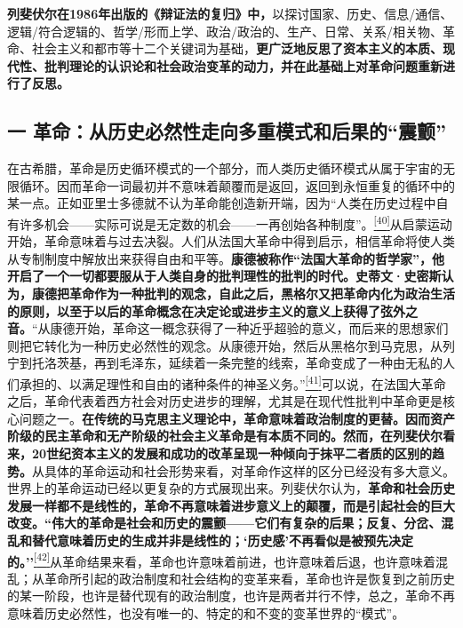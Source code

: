\documentclass[UTF8, fontset = sourcesans, a4paper, oneside, zihao =
-4, scheme=chinese, no-math, space=true]{ctexbook}
\begin{document}
\textbf{列斐伏尔在1986年出版的《辩证法的复归》中，}以探讨国家、历史、信息/通信、逻辑/符合逻辑的、哲学/形而上学、政治/政治的、生产、日常、关系/相关物、革命、社会主义和都市等十二个关键词为基础，\textbf{更广泛地反思了资本主义的本质、现代性、批判理论的认识论和社会政治变革的动力，并在此基础上对革命问题重新进行了反思。}

\subsection{\texorpdfstring{一
革命：从历史必然性走向多重模式和后果的``震颤''}{一 革命：从历史必然性走向多重模式和后果的震颤}}\label{part0008_split_003.htmlux5cux23c043}

在古希腊，革命是历史循环模式的一个部分，而人类历史循环模式从属于宇宙的无限循环。因而革命一词最初并不意味着颠覆而是返回，返回到永恒重复的循环中的某一点。正如亚里士多德就不认为革命能创造新开端，因为``人类在历史过程中自有许多机会------实际可说是无定数的机会------一再创始各种制度''。\protect\hypertarget{part0008_split_003.htmlux5cux23w40}{}{}\protect\hyperlink{part0008_split_003.htmlux5cux23m40}{\textsuperscript{{[}40{]}}}从启蒙运动开始，革命意味着与过去决裂。人们从法国大革命中得到启示，相信革命将使人类从专制制度中解放出来获得自由和平等。\textbf{康德被称作``法国大革命的哲学家''，他开启了一个一切都要服从于人类自身的批判理性的批判的时代。史蒂文·史密斯认为，康德把革命作为一种批判的观念，自此之后，黑格尔又把革命内化为政治生活的原则，以至于以后的革命概念在决定论或进步主义的意义上获得了弦外之音。}``从康德开始，革命这一概念获得了一种近乎超验的意义，而后来的思想家们则把它转化为一种历史必然性的观念。从康德开始，然后从黑格尔到马克思，从列宁到托洛茨基，再到毛泽东，延续着一条完整的线索，革命变成了一种由无私的人们承担的、以满足理性和自由的诸种条件的神圣义务。''\protect\hypertarget{part0008_split_003.htmlux5cux23w41}{}{}\protect\hyperlink{part0008_split_003.htmlux5cux23m41}{\textsuperscript{{[}41{]}}}可以说，在法国大革命之后，革命代表着西方社会对历史进步的理解，尤其是在现代性批判中革命更是核心问题之一。\textbf{在传统的马克思主义理论中，革命意味着政治制度的更替。因而资产阶级的民主革命和无产阶级的社会主义革命是有本质不同的。然而，在列斐伏尔看来，20世纪资本主义的发展和成功的改革呈现一种倾向于抹平二者质的区别的趋势。}从具体的革命运动和社会形势来看，对革命作这样的区分已经没有多大意义。世界上的革命运动已经以更复杂的方式展现出来。列斐伏尔认为，\textbf{革命和社会历史发展一样都不是线性的，革命不再意味着进步意义上的颠覆，而是引起社会的巨大改变。``伟大的革命是社会和历史的震颤------它们有复杂的后果；反复、分岔、混乱和替代意味着历史的生成并非是线性的；`历史感'不再看似是被预先决定的。''}\protect\hypertarget{part0008_split_003.htmlux5cux23w42}{}{}\protect\hyperlink{part0008_split_003.htmlux5cux23m42}{\textsuperscript{{[}42{]}}}从革命结果来看，革命也许意味着前进，也许意味着后退，也许意味着混乱；从革命所引起的政治制度和社会结构的变革来看，革命也许是恢复到之前历史的某一阶段，也许是替代现有的政治制度，也许是两者并行不悖，总之，革命不再意味着历史必然性，也没有唯一的、特定的和不变的变革世界的``模式''。
\end{document}
